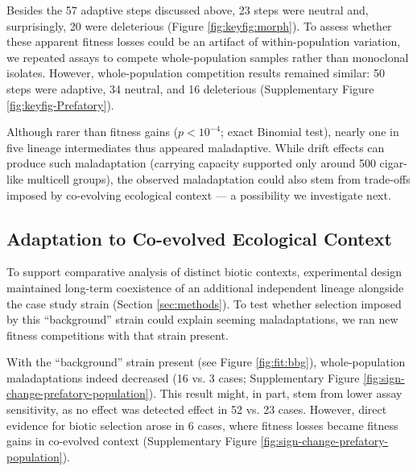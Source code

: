 Besides the 57 adaptive steps discussed above, 23 steps were neutral and, surprisingly, 20 were deleterious (Figure \ref{fig:keyfig:morph}).
To assess whether these apparent fitness losses could be an artifact of within-population variation, we repeated assays to compete whole-population samples rather than monoclonal isolates.
However, whole-population competition results remained similar: 50 steps were adaptive, 34 neutral, and 16 deleterious (Supplementary Figure \ref{fig:keyfig-Prefatory}).

Although rarer than fitness gains ($p < 10^{-4}$; exact Binomial test), nearly one in five lineage intermediates thus appeared maladaptive.
While drift effects can produce such maladaptation (carrying capacity supported only around 500 cigar-like multicell groups), the observed maladaptation could also stem from trade-offs imposed by co-evolving ecological context \citep{brady2019causes} --- a possibility we investigate next.

\subsection{Adaptation to Co-evolved Ecological Context}
\label{sec:adaptation-to-coevolved-ecological-context}

To support comparative analysis of distinct biotic contexts, experimental design maintained long-term coexistence of an additional independent lineage alongside the case study strain (Section \ref{sec:methods}).
To test whether selection imposed by this ``background'' strain could explain seeming maladaptations, we ran new fitness competitions with that strain present.

With the ``background'' strain present (see Figure \ref{fig:fit:bbg}), whole-population maladaptations indeed decreased (16 vs. 3 cases; Supplementary Figure \ref{fig:sign-change-prefatory-population}).
This result might, in part, stem from lower assay sensitivity, as no effect was detected effect in 52 vs. 23 cases.
However, direct evidence for biotic selection arose in 6 cases, where fitness losses became fitness gains in co-evolved context (Supplementary Figure \ref{fig:sign-change-prefatory-population}).

